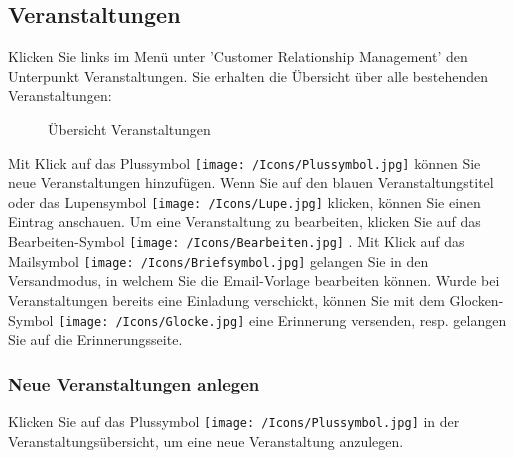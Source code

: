 \vspace{\baselineskip}

\subsection{Veranstaltungen}

Klicken Sie links im Menü unter 'Customer Relationship Management' den Unterpunkt Veranstaltungen. Sie erhalten die Übersicht über alle bestehenden Veranstaltungen:

\begin{figure}[H]
\caption{Übersicht Veranstaltungen}
\end{figure}

Mit Klick auf das Plussymbol \texttt{[image: /Icons/Plussymbol.jpg]}  können Sie neue Veranstaltungen hinzufügen. Wenn Sie auf den blauen Veranstaltungstitel oder das Lupensymbol \texttt{[image: /Icons/Lupe.jpg]}  klicken, können Sie einen Eintrag anschauen. Um eine Veranstaltung zu bearbeiten, klicken Sie auf das Bearbeiten-Symbol \texttt{[image: /Icons/Bearbeiten.jpg]} . Mit Klick auf das Mailsymbol \texttt{[image: /Icons/Briefsymbol.jpg]}  gelangen Sie in den Versandmodus, in welchem Sie die Email-Vorlage bearbeiten können. Wurde bei Veranstaltungen bereits eine Einladung verschickt, können Sie mit dem Glocken-Symbol \texttt{[image: /Icons/Glocke.jpg]}  eine Erinnerung versenden, resp. gelangen Sie auf die Erinnerungsseite.

\subsubsection{Neue Veranstaltungen anlegen}

Klicken Sie auf das Plussymbol \texttt{[image: /Icons/Plussymbol.jpg]} in der Veranstaltungsübersicht, um eine neue Veranstaltung anzulegen.

